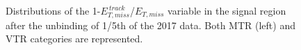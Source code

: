 \begin{figure}[htbp]
  \centering
  \caption{Distributions of the 1-$E_{T,miss}^{~track}$/$E_{T, miss}$ variable in the signal region after the unbinding of 1/5th of the 2017 data. Both MTR (left) and VTR categories are represented.}
  \label{fig:met_vs_tkmet_2017}
\end{figure}

